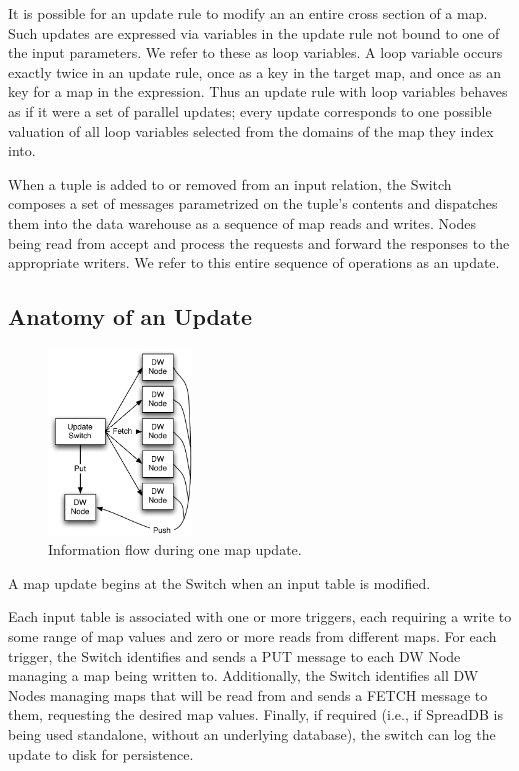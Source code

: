 \documentclass{sig-alternate}
\begin{document}
It is possible for an update rule to modify an an entire cross section of a map.  Such updates are expressed via variables in the update rule not bound to one of the input parameters.  We refer to these as loop variables.  A loop variable occurs exactly twice in an update rule, once as a key in the target map, and once as an key for a map in the expression.  Thus an update rule with loop variables behaves as if it were a set of parallel updates; every update corresponds to one possible valuation of all loop variables selected from the domains of the map they index into.

When a tuple is added to or removed from an input relation, the Switch composes a set of messages parametrized on the tuple's contents and dispatches them into the data warehouse as a sequence of map reads and writes.  Nodes being read from accept and process the requests and forward the responses to the appropriate writers.  We refer to this entire sequence of operations as an update.

\subsection{Anatomy of an Update}

\begin{figure}
\begin{center}
\includegraphics[width=1.5in]{images/UpdateStep.pdf}
\caption{Information flow during one map update.}
\label{fig:updatestep}
\end{center}
\end{figure}

A map update begins at the Switch when an input table is modified.  


Each input table is associated with one or more triggers, each requiring a write to some range of map values and zero or more reads from different maps.  For each trigger, the Switch identifies and sends a PUT message to each DW Node managing a map being written to.  Additionally, the Switch identifies all DW Nodes managing maps that will be read from and sends a FETCH message to them, requesting the desired map values.  Finally, if required (i.e., if SpreadDB is being used standalone, without an underlying database), the switch can log the update to disk for persistence.
\end{document}
